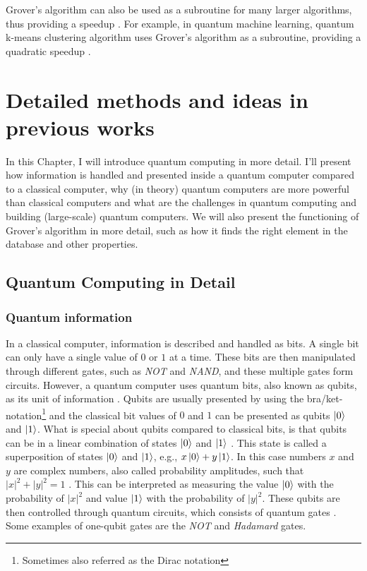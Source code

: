 \documentclass[english,oneside,openright]{UH_DS_report}
\begin{document}
Grover's algorithm can also be used as a subroutine for many larger algorithms, thus providing a speedup \cite{giri2017review}. For example, in quantum machine learning, quantum k-means clustering algorithm uses Grover's algorithm as a subroutine, providing a quadratic speedup \cite{zhang2020recent}.

\chapter{Detailed methods and ideas in previous works}
\label{chapter:previouswork}

In this Chapter, I will introduce quantum computing in more detail. I'll present how information is handled and presented inside a quantum computer compared to a classical computer, why (in theory) quantum computers are more powerful than classical computers and what are the challenges in quantum computing and building (large-scale) quantum computers. We will also present the functioning of Grover's algorithm in more detail, such as how it finds the right element in the database and other properties.

\section{Quantum Computing in Detail}

\subsection{Quantum information}
In a classical computer, information is described and handled as bits. A single bit can only have a single value of $0$ or $1$ at a time. These bits are then manipulated through different gates, such as \emph{NOT} and \emph{NAND}, and these multiple gates form circuits. However, a quantum computer uses quantum bits, also known as qubits, as its unit of information \cite{introtoqc}. Qubits are usually presented by using the bra/ket-notation\footnote{Sometimes also referred as the Dirac notation} and the classical bit values of $0$ and $1$ can be presented as qubits $\ket{0}$ and $\ket{1}$. What is special about qubits compared to classical bits, is that qubits can be in a linear combination of states $\ket{0}$ and $\ket{1}$ \cite{lavor2003grover}. This state is called a superposition of states $\ket{0}$ and $\ket{1}$, e.g., $x \ket{0} + y \ket{1}$. In this case numbers $x$ and $y$ are complex numbers, also called probability amplitudes, such that $|x|^{2} + |y|^{2} = 1$ \cite{qcdb}. This can be interpreted as measuring the value $\ket{0}$ with the probability of $|x|^{2}$ and value $\ket{1}$ with the probability of $|y|^{2}$. These qubits are then controlled through quantum circuits, which consists of quantum gates \cite{lavor2003grover}. Some examples of one-qubit gates are the \emph{NOT} and \emph{Hadamard} gates.
\end{document}
